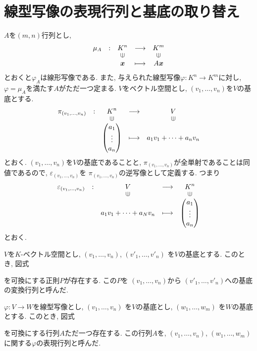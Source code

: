 \section{線型写像の表現行列と基底の取り替え}
$A$を$(m,n)$行列とし,
\begin{align*}
  \shazo{\mu_A}
        {K^n}{K^m}
        {\xx}{A\xx}
\end{align*}
とおくと$\varphi_A$は線形写像である.
また, 与えられた線型写像$\varphi\colon K^n\to K^m$に対し,
$\varphi=\mu_A$を満たす$A$がただ一つ定まる.
$V$をベクトル空間とし,
$(v_1,\ldots,v_n)$を$V$の基底とする.
\begin{align*}
  \shazo{\pi_{(v_1,\ldots,v_n)}}
        {K^n}{V}
        {\begin{pmatrix}a_1\\\vdots\\a_n\end{pmatrix}}{a_1v_1+\cdots+a_nv_n}
\end{align*}
とおく.
$(v_1,\ldots,v_n)$を$V$の基底であることと,
$\pi_{(v_1,\ldots,v_n)}$が全単射であることは同値であるので,
$\varepsilon_{(v_1,\ldots,v_n)}$を
$\pi_{(v_1,\ldots,v_n)}$の逆写像として定義する.
つまり
\begin{align*}
  \shazo{\varepsilon_{(v_1,\ldots,v_n)}}
        {V}{K^n}
        {a_1v_1+\cdots+a_Nv_n}{\begin{pmatrix}a_1\\\vdots\\a_n\end{pmatrix}}
\end{align*}
とおく.

$V$を$K$-ベクトル空間とし,
$(v_1,\ldots,v_n)$,
$(v'_1,\ldots,v'_n)$
を$V$の基底とする.
このとき, 図式
\begin{center}
\end{center}
を可換にする正則$P$が存在する.
この$P$を
$(v_1,\ldots,v_n)$から
$(v'_1,\ldots,v'_n)$への基底の変換行列と呼んだ.

$\varphi\colon V\to W$を線型写像とし,
$(v_1,\ldots,v_n)$
を$V$の基底とし,
$(w_1,\ldots,w_m)$
を$W$の基底とする.
このとき, 図式
\begin{center}
\end{center}
を可換にする行列$A$ただ一つ存在する.
この行列$A$を,
$(v_1,\ldots,v_n)$,
$(w_1,\ldots,w_m)$
に関する$\varphi$の表現行列と呼んだ.

